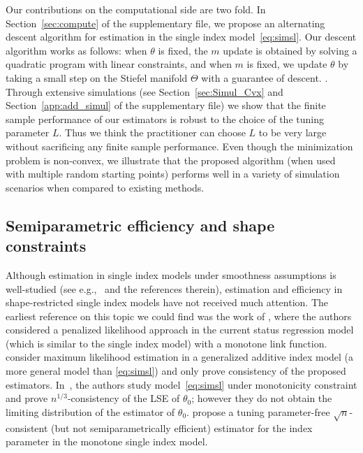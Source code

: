 Our contributions on the computational side are two fold. In Section~\ref{sec:compute} of the supplementary file, we propose an alternating descent algorithm for estimation in the single index model~\eqref{eq:simsl}. Our descent algorithm works as follows: when $\theta$ is fixed, the $m$ update is obtained by solving a quadratic program with linear constraints, and when $m$ is fixed, we update $\theta$ by taking a small step on the Stiefel manifold $\Theta$ with a guarantee of descent. \fi
  \fi. Through extensive simulations (see Section~\ref{sec:Simul_Cvx} and Section~\ref{app:add_simul} of the supplementary file) we show that the finite sample performance of our estimators is robust to the choice of the tuning parameter $L$.  Thus we think the practitioner can choose $L$ to be very large without sacrificing any finite sample performance. Even though the minimization problem is non-convex, we illustrate that the proposed algorithm (when used with multiple random starting points) performs well in a variety of simulation scenarios when compared to existing methods.




\subsection{Semiparametric efficiency and shape constraints} %
\label{sub:_semiparametric_eff_shape}
Although estimation in single index models under smoothness assumptions is well-studied (see e.g.,~\cite{Powelletal89,LiDuan89,ICHI93,HardleEtAl93,Hristacheetal01,DelecroixEtal06,MR2529970,cuietal11} and the references therein), estimation and efficiency in shape-restricted single index models have not received much attention. The earliest reference on this topic we could find was the work of \citet{VANC}, where the authors considered a penalized likelihood approach in the current status regression model (which is similar to the single index model) with a monotone link function.~\citet{CHSA} consider maximum likelihood estimation in a generalized additive index model (a more general model than \eqref{eq:simsl}) and only prove consistency of the proposed estimators.  In~\citet{2016arXiv161006026B}, the authors study model~\eqref{eq:simsl} under  monotonicity constraint and prove $n^{1/3}$-consistency of the LSE of $\theta_0$; however they do not obtain the limiting distribution of the estimator of $\theta_0.$ \citet{2017arXiv171205593B} propose a tuning parameter-free $\sqrt{n}$-consistent (but not semiparametrically efficient) estimator for the index parameter in the monotone  single index model. 

